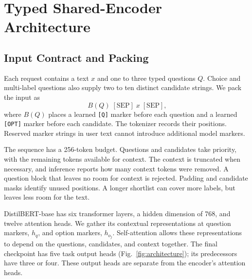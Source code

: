 \documentclass[conference]{IEEEtran}
\begin{document}
\section{Typed Shared-Encoder Architecture}
\subsection{Input Contract and Packing}
Each request contains a text $x$ and one to three typed questions $Q$. Choice and multi-label questions also supply two to ten distinct candidate strings. We pack the input as
\begin{equation}
[\mathrm{CLS}]\;B(Q)\;[\mathrm{SEP}]\;x\;[\mathrm{SEP}],
\end{equation}
where $B(Q)$ places a learned \texttt{[Q]} marker before each question and a learned \texttt{[OPT]} marker before each candidate. The tokenizer records their positions. Reserved marker strings in user text cannot introduce additional model markers.

The sequence has a 256-token budget. Questions and candidates take priority, with the remaining tokens available for context. The context is truncated when necessary, and inference reports how many context tokens were removed. A question block that leaves no room for context is rejected. Padding and candidate masks identify unused positions. A longer shortlist can cover more labels, but leaves less room for the text.

DistilBERT-base has six transformer layers, a hidden dimension of 768, and twelve attention heads. We gather its contextual representations at question markers, $h_q$, and option markers, $h_{o_j}$. Self-attention allows these representations to depend on the questions, candidates, and context together. The final checkpoint has five task output heads (Fig.~\ref{fig:architecture}); its predecessors have three or four. These output heads are separate from the encoder's attention heads.
\end{document}
